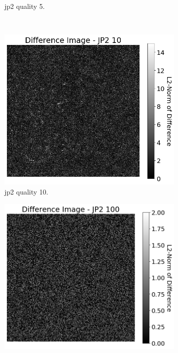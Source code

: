 \begin{figure}[htb]
\begin{subfigure}[b]{0.42\textwidth}
            \caption{\gls{jp2} quality 5.}
            \label{fig:img_quality_center_heatmap_rel_5}
        \end{subfigure}
        \\
        \begin{subfigure}[b]{0.42\textwidth}
            \centering
            \includegraphics[width=\textwidth]{doc/thesis/0_figures/compare_quality/set1/jp2_10_center_diff_heatmap_rel.png}
            \caption{\gls{jp2} quality 10.}
            \label{fig:img_quality_center_heatmap_rel_10}
        \end{subfigure}
        \begin{subfigure}[b]{0.42\textwidth}
            \centering
            \includegraphics[width=\textwidth]{doc/thesis/0_figures/compare_quality/set1/jp2_100_center_diff_heatmap_rel.png}

\end{subfigure}
\end{figure}
